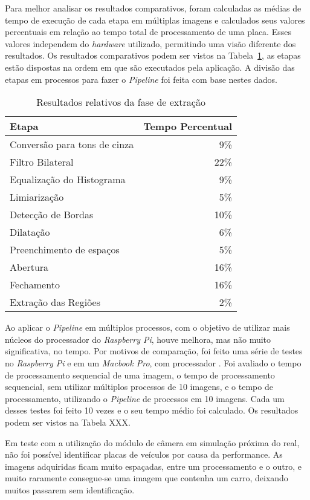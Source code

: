 Para melhor analisar os resultados comparativos, foram calculadas as médias de
tempo de execução de cada etapa em múltiplas imagens e calculados seus valores
percentuais em relação ao tempo total de processamento de uma placa. Esses
valores independem do \emph{hardware} utilizado, permitindo uma visão diferente dos resultados. 
Os resultados comparativos podem ser vistos na Tabela~\ref{tab:resultados_relativos}, as etapas 
estão dispostas na ordem em que são executados pela aplicação. A divisão
das etapas em processos para fazer o \emph{Pipeline} foi feita com base nestes dados.

\begin{table}[H]
\centering
\caption{Resultados relativos da fase de extração}
\label{tab:resultados_relativos}
\begin{tabular}{@{}lr@{}}
\toprule
Etapa                        & Tempo Percentual \\ \midrule
Conversão para tons de cinza & 9\%             \\
Filtro Bilateral             & 22\%             \\
Equalização do Histograma    & 9\%             \\
Limiarização                 & 5\%             \\
Detecção de Bordas           & 10\%             \\
Dilatação                    & 6\%             \\
Preenchimento de espaços     & 5\%             \\
Abertura                     & 16\%             \\
Fechamento                   & 16\%             \\
Extração das Regiões         & 2\%             \\ \bottomrule
\end{tabular}
\end{table}

Ao aplicar o \emph{Pipeline} em múltiplos processos, com o objetivo de
utilizar mais núcleos do processador do \emph{Raspberry Pi}, houve melhora, mas
não muito significativa, no tempo. Por motivos de comparação, foi feito
uma série de testes no \emph{Raspberry Pi} e em um 
\emph{Macbook Pro}, com processador \emph{}. Foi avaliado o tempo de processamento
sequencial de uma imagem, o tempo de processamento sequencial, sem utilizar múltiplos processos
de 10 imagens, e o tempo de processamento, utilizando o \emph{Pipeline} de processos
em 10 imagens. Cada um desses testes foi feito 10 vezes e o seu tempo médio foi calculado.
Os resultados podem ser vistos na Tabela XXX.

Em teste com a utilização do módulo de câmera em simulação próxima do real, não foi possível
identificar placas de veículos por causa da performance. As imagens adquiridas ficam muito espaçadas, 
entre um processamento e o outro, e muito raramente consegue-se uma imagem que contenha um carro, deixando
muitos passarem sem identificação.

